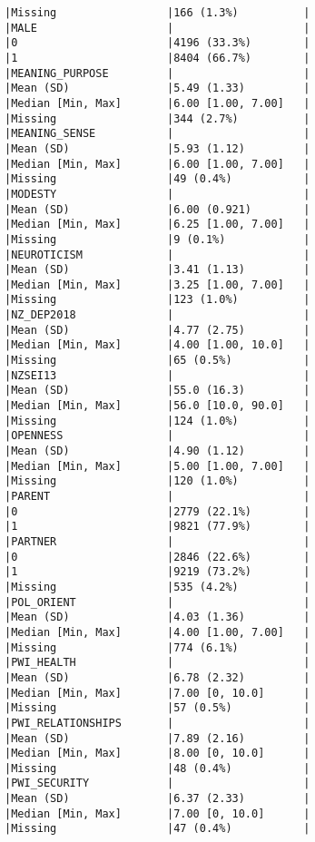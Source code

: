 \documentclass[
  singlecolumn]{report}
\begin{document}
\begin{verbatim}
|Missing                 |166 (1.3%)          |
|MALE                    |                    |
|0                       |4196 (33.3%)        |
|1                       |8404 (66.7%)        |
|MEANING_PURPOSE         |                    |
|Mean (SD)               |5.49 (1.33)         |
|Median [Min, Max]       |6.00 [1.00, 7.00]   |
|Missing                 |344 (2.7%)          |
|MEANING_SENSE           |                    |
|Mean (SD)               |5.93 (1.12)         |
|Median [Min, Max]       |6.00 [1.00, 7.00]   |
|Missing                 |49 (0.4%)           |
|MODESTY                 |                    |
|Mean (SD)               |6.00 (0.921)        |
|Median [Min, Max]       |6.25 [1.00, 7.00]   |
|Missing                 |9 (0.1%)            |
|NEUROTICISM             |                    |
|Mean (SD)               |3.41 (1.13)         |
|Median [Min, Max]       |3.25 [1.00, 7.00]   |
|Missing                 |123 (1.0%)          |
|NZ_DEP2018              |                    |
|Mean (SD)               |4.77 (2.75)         |
|Median [Min, Max]       |4.00 [1.00, 10.0]   |
|Missing                 |65 (0.5%)           |
|NZSEI13                 |                    |
|Mean (SD)               |55.0 (16.3)         |
|Median [Min, Max]       |56.0 [10.0, 90.0]   |
|Missing                 |124 (1.0%)          |
|OPENNESS                |                    |
|Mean (SD)               |4.90 (1.12)         |
|Median [Min, Max]       |5.00 [1.00, 7.00]   |
|Missing                 |120 (1.0%)          |
|PARENT                  |                    |
|0                       |2779 (22.1%)        |
|1                       |9821 (77.9%)        |
|PARTNER                 |                    |
|0                       |2846 (22.6%)        |
|1                       |9219 (73.2%)        |
|Missing                 |535 (4.2%)          |
|POL_ORIENT              |                    |
|Mean (SD)               |4.03 (1.36)         |
|Median [Min, Max]       |4.00 [1.00, 7.00]   |
|Missing                 |774 (6.1%)          |
|PWI_HEALTH              |                    |
|Mean (SD)               |6.78 (2.32)         |
|Median [Min, Max]       |7.00 [0, 10.0]      |
|Missing                 |57 (0.5%)           |
|PWI_RELATIONSHIPS       |                    |
|Mean (SD)               |7.89 (2.16)         |
|Median [Min, Max]       |8.00 [0, 10.0]      |
|Missing                 |48 (0.4%)           |
|PWI_SECURITY            |                    |
|Mean (SD)               |6.37 (2.33)         |
|Median [Min, Max]       |7.00 [0, 10.0]      |
|Missing                 |47 (0.4%)           |

\end{verbatim}
\end{document}
